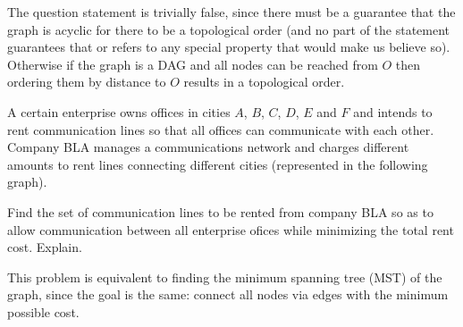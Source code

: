 \documentclass{cal}
\begin{document}
{The question statement is trivially false, since there must be a guarantee that the graph is acyclic for there to be a topological order (and no part of the statement guarantees that or refers to any special property that would make us believe so). Otherwise if the graph is a DAG and all nodes can be reached from $O$ then ordering them by distance to $O$ results in a topological order.

A certain enterprise owns offices in cities $A$, $B$, $C$, $D$, $E$ and $F$ and intends to rent communication lines so that all offices can communicate with each other. Company BLA manages a communications network and charges different amounts to rent lines connecting different cities (represented in the following graph).

\begin{center}
\end{center}

Find the set of communication lines to be rented from company BLA so as to allow communication between all enterprise ofices while minimizing the total rent cost. Explain.

\ansseparator

This problem is equivalent to finding the minimum spanning tree (MST) of the graph, since the goal is the same: connect all nodes via edges with the minimum possible cost.

}
\end{document}
